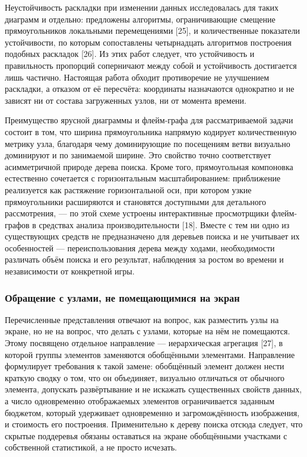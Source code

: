 Неустойчивость раскладки при изменении данных исследовалась для таких диаграмм и отдельно: предложены алгоритмы, ограничивающие смещение прямоугольников локальными перемещениями [25], и количественные показатели устойчивости, по которым сопоставлены четырнадцать алгоритмов построения подобных раскладок [26]. Из этих работ следует, что устойчивость и правильность пропорций соперничают между собой и устойчивость достигается лишь частично. Настоящая работа обходит противоречие не улучшением раскладки, а отказом от её пересчёта: координаты назначаются однократно и не зависят ни от состава загруженных узлов, ни от момента времени.

Преимущество ярусной диаграммы и флейм-графа для рассматриваемой задачи состоит в том, что ширина прямоугольника напрямую кодирует количественную метрику узла, благодаря чему доминирующие по посещениям ветви визуально доминируют и по занимаемой ширине. Это свойство точно соответствует асимметричной природе дерева поиска. Кроме того, прямоугольная компоновка естественно сочетается с горизонтальным масштабированием: приближение реализуется как растяжение горизонтальной оси, при котором узкие прямоугольники расширяются и становятся доступными для детального рассмотрения, — по этой схеме устроены интерактивные просмотрщики флейм-графов в средствах анализа производительности [18]. Вместе с тем ни одно из существующих средств не предназначено для деревьев поиска и не учитывает их особенностей — переиспользования дерева между ходами, необходимости различать объём поиска и его результат, наблюдения за ростом во времени и независимости от конкретной игры.

\subsubsection{Обращение с узлами, не помещающимися на экран}

Перечисленные представления отвечают на вопрос, как разместить узлы на экране, но не на вопрос, что делать с узлами, которые на нём не помещаются. Этому посвящено отдельное направление — иерархическая агрегация [27], в которой группы элементов заменяются обобщёнными элементами. Направление формулирует требования к такой замене: обобщённый элемент должен нести краткую сводку о том, что он объединяет, визуально отличаться от обычного элемента, допускать развёртывание и не искажать существенных свойств данных, а число одновременно отображаемых элементов ограничивается заданным бюджетом, который удерживает одновременно и загромождённость изображения, и стоимость его построения. Применительно к дереву поиска отсюда следует, что скрытые поддеревья обязаны оставаться на экране обобщёнными участками с собственной статистикой, а не просто исчезать.

